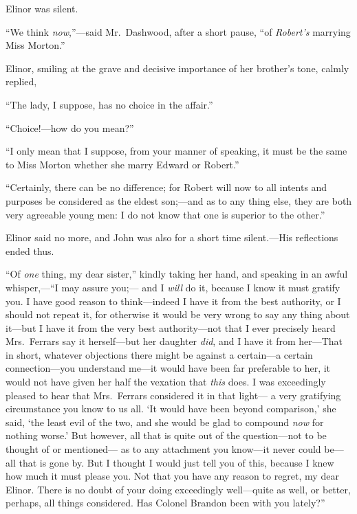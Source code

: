 \documentclass{article}
\begin{document}
Elinor was silent.

``We think \emph{now},''---said Mr.\ Dashwood, after a short pause,
``of \emph{Robert's} marrying Miss Morton.''

Elinor, smiling at the grave and decisive importance
of her brother's tone, calmly replied,

``The lady, I suppose, has no choice in the affair.''

``Choice!---how do you mean?''

``I only mean that I suppose, from your manner
of speaking, it must be the same to Miss Morton whether
she marry Edward or Robert.''

``Certainly, there can be no difference; for Robert
will now to all intents and purposes be considered
as the eldest son;---and as to any thing else, they are
both very agreeable young men: I do not know that one
is superior to the other.''

Elinor said no more, and John was also for a short
time silent.---His reflections ended thus.

``Of \emph{one} thing, my dear sister,'' kindly taking her hand,
and speaking in an awful whisper,---``I may assure you;---%
and I \emph{will} do it, because I know it must gratify you.
I have good reason to think---indeed I have it from the
best authority, or I should not repeat it, for otherwise
it would be very wrong to say any thing about it---but
I have it from the very best authority---not that I ever
precisely heard Mrs.\ Ferrars say it herself---but her
daughter \emph{did}, and I have it from her---That in short,
whatever objections there might be against a certain---a
certain connection---you understand me---it would have been
far preferable to her, it would not have given her half
the vexation that \emph{this} does.  I was exceedingly pleased
to hear that Mrs.\ Ferrars considered it in that light---%
a very gratifying circumstance you know to us all.
`It would have been beyond comparison,' she said, `the least
evil of the two, and she would be glad to compound \emph{now}
for nothing worse.' But however, all that is quite out
of the question---not to be thought of or mentioned---%
as to any attachment you know---it never could be---all
that is gone by.  But I thought I would just tell you
of this, because I knew how much it must please you.
Not that you have any reason to regret, my dear Elinor.  There
is no doubt of your doing exceedingly well---quite as well,
or better, perhaps, all things considered.  Has Colonel
Brandon been with you lately?''
\end{document}
